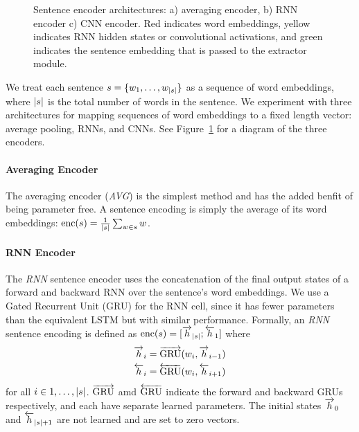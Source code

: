 \begin{figure}
  \caption{Sentence encoder architectures: a) averaging encoder, b) RNN encoder
           c) CNN encoder. Red indicates word embeddings, yellow indicates
           RNN hidden states or convolutional activations, and green 
           indicates the sentence embedding that is passed to the extractor
           module.}
    \label{fig:encoders}
\end{figure}


We treat each sentence $s = \{w_1, \ldots, w_{|s|}\}$ 
as a sequence of word embeddings, where $|s|$ is the total number of words
in the sentence. We experiment with three architectures for mapping sequences
of word embeddings to a fixed length vector: average pooling, RNNs, and CNNs.
See Figure~\ref{fig:encoders} for a diagram of the three encoders.

\paragraph{Averaging Encoder} The averaging encoder (\textit{AVG}) is the simplest
method and has the added benfit of being parameter free. 
A sentence encoding is simply the average of its word embeddings: 
$\operatorname{enc}(s) = \frac{1}{|s|} \sum_{w \in s} w$.

\paragraph{RNN Encoder} The \textit{RNN} sentence encoder uses the concatenation 
of the
final output states of a forward and backward RNN over the sentence's word
embeddings. We use a Gated Recurrent Unit (GRU) \cite{cho} for the RNN cell,
since it has fewer parameters than the equivalent LSTM but with similar 
performance. Formally, an \textit{RNN} sentence encoding is defined as
$\operatorname{enc}(s) = [\overrightarrow{h}_{|s|}; \overleftarrow{h}_1]$
where 
\begin{align} 
\overrightarrow{h}_i &= \overrightarrow{\operatorname{GRU}}(w_i, \overrightarrow{h}_{i-1}) \\
\overleftarrow{h}_i &= \overleftarrow{\operatorname{GRU}}(w_i, \overleftarrow{h}_{i+1}) 
\end{align}
for all $i \in 1, \ldots, |s|$. $\overrightarrow{\operatorname{GRU}}$ amd $\overleftarrow{\operatorname{GRU}}$ indicate the 
forward and backward GRUs respectively, and each have separate learned 
parameters.
The initial states $\overrightarrow{h}_0$ and $\overleftarrow{h}_{|s| + 1}$ are not 
learned and are set to zero vectors.

